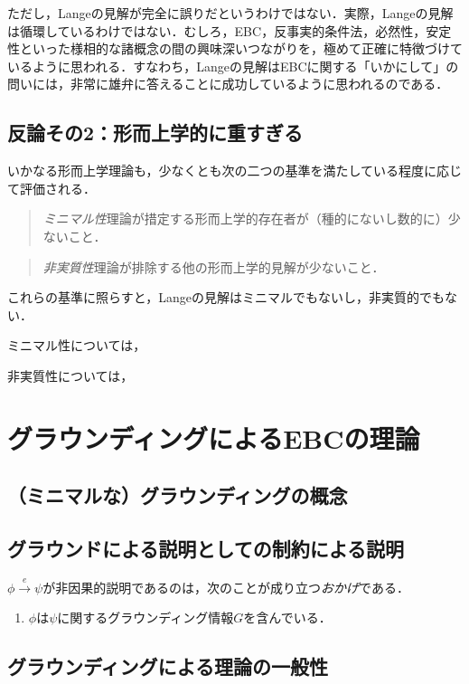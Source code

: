 \documentclass[dvipdfmx,twoside,11pt,uplatex]{jsarticle}
\theoremstyle{definition}
\begin{document}
ただし，Langeの見解が完全に誤りだというわけではない．実際，Langeの見解は循環しているわけではない．むしろ，EBC，反事実的条件法，必然性，安定性といった様相的な諸概念の間の興味深いつながりを，極めて正確に特徴づけているように思われる．すなわち，Langeの見解はEBCに関する「いかにして」の問いには，非常に雄弁に答えることに成功しているように思われるのである．

\subsection{反論その2：形而上学的に重すぎる}\label{secondobjection}

いかなる形而上学理論も，少なくとも次の二つの基準を満たしている程度に応じて評価される．
\begin{quote}
    \emph{ミニマル性}\quad 理論が措定する形而上学的存在者が（種的にないし数的に）少ないこと．
\end{quote}

\begin{quote}
    \emph{非実質性}\quad 理論が排除する他の形而上学的見解が少ないこと．
\end{quote}
これらの基準に照らすと，Langeの見解はミニマルでもないし，非実質的でもない．

ミニマル性については，

非実質性については，

\section{グラウンディングによるEBCの理論}

\subsection{（ミニマルな）グラウンディングの概念}

\subsection{グラウンドによる説明としての制約による説明}
$\phi\xrightarrow{e}\psi$が非因果的説明であるのは，次のことが成り立つ\emph{おかげ}である．
	\begin{enumerate}
	\item $\phi$は$\psi$に関するグラウンディング情報$G$を含んでいる．
	\end{enumerate}

\subsection{グラウンディングによる理論の一般性}
\end{document}

